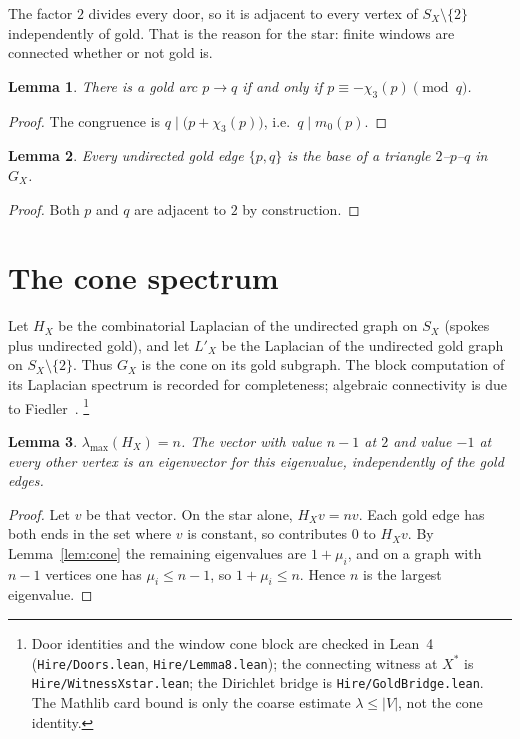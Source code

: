 \documentclass[11pt,a4paper]{article}
\newtheorem{lemma}{Lemma}
\begin{document}
The factor \(2\) divides every door, so it is adjacent to every vertex of \(S_X\setminus\{2\}\) independently of gold.
That is the reason for the star: finite windows are connected whether or not gold is.

\begin{lemma}
\label{lem:gold-cong}
There is a gold arc \(p\to q\) if and only if \(p\equiv -\chi_3(p)\pmod{q}\).
\end{lemma}

\begin{proof}
The congruence is \(q\mid\bigl(p+\chi_3(p)\bigr)\), i.e.\ \(q\mid m_0(p)\).
\end{proof}

\begin{lemma}
\label{lem:triangle}
Every undirected gold edge \(\{p,q\}\) is the base of a triangle \(2\)--\(p\)--\(q\) in \(G_X\).
\end{lemma}

\begin{proof}
Both \(p\) and \(q\) are adjacent to \(2\) by construction.
\end{proof}

\section{The cone spectrum}

Let \(H_X\) be the combinatorial Laplacian of the undirected graph on \(S_X\) (spokes plus undirected gold), and let \(L'_X\) be the Laplacian of the undirected gold graph on \(S_X\setminus\{2\}\).
Thus \(G_X\) is the cone on its gold subgraph.
The block computation of its Laplacian spectrum is recorded for completeness; algebraic connectivity is due to Fiedler~\cite{Fiedler}.
\footnote{Door identities and the window cone block are checked in Lean~4 (\texttt{Hire/Doors.lean}, \texttt{Hire/Lemma8.lean}); the connecting witness at \(X^*\) is \texttt{Hire/WitnessXstar.lean}; the Dirichlet bridge is \texttt{Hire/GoldBridge.lean}. The Mathlib card bound is only the coarse estimate \(\lambda\le |V|\), not the cone identity.}

\begin{lemma}
\label{lem:lambda-max}
\(\lambda_{\max}(H_X)=n\).
The vector with value \(n-1\) at \(2\) and value \(-1\) at every other vertex is an eigenvector for this eigenvalue, independently of the gold edges.
\end{lemma}

\begin{proof}
Let \(v\) be that vector.
On the star alone, \(H_Xv=nv\).
Each gold edge has both ends in the set where \(v\) is constant, so contributes \(0\) to \(H_Xv\).
By Lemma~\ref{lem:cone} the remaining eigenvalues are \(1+\mu_i\), and on a graph with \(n-1\) vertices one has \(\mu_i\le n-1\), so \(1+\mu_i\le n\).
Hence \(n\) is the largest eigenvalue.
\end{proof}
\end{document}

